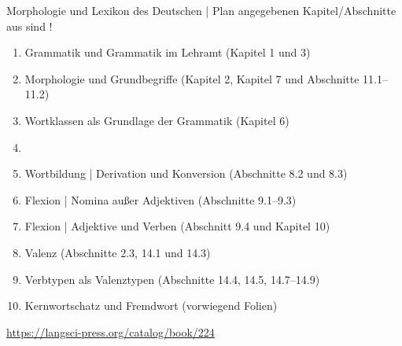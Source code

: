 \begin{frame}
  {Morphologie und Lexikon des Deutschen | Plan}
   angegebenen Kapitel\slash Abschnitte aus  sind !\\
  \Halbzeile
  \begin{enumerate}
    \item Grammatik und Grammatik im Lehramt (Kapitel 1 und 3)
    \item Morphologie und Grundbegriffe (Kapitel 2, Kapitel 7 und Abschnitte 11.1--11.2)
    \item Wortklassen als Grundlage der Grammatik (Kapitel 6)
    \item {}
    \item Wortbildung | Derivation und Konversion (Abschnitte 8.2 und 8.3)
    \item Flexion | Nomina außer Adjektiven (Abschnitte 9.1--9.3)
    \item Flexion | Adjektive und Verben (Abschnitt 9.4 und Kapitel 10)
    \item Valenz (Abschnitte 2.3, 14.1 und 14.3)
    \item Verbtypen als Valenztypen (Abschnitte 14.4, 14.5, 14.7--14.9) 
    \item Kernwortschatz und Fremdwort (vorwiegend Folien)
  \end{enumerate}
  \Halbzeile
  \centering 
  \url{https://langsci-press.org/catalog/book/224}
\end{frame}


